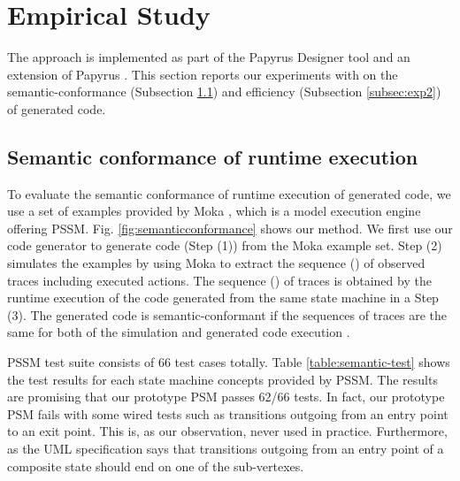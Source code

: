 \section{Empirical Study}
\label{sec:exp}
The approach is implemented as part of the Papyrus Designer tool \cite{qompass} and an extension  of Papyrus \cite{cea-list_papyrus_????}. This section reports our experiments with  on the semantic-conformance (Subsection \ref{subsec:exp1}) and efficiency (Subsection \ref{subsec:exp2}) of generated code.

\subsection{Semantic conformance of runtime execution}
\label{subsec:exp1}
\noindent
{} 

To evaluate the semantic conformance of runtime execution of generated code, we use a set of examples provided by Moka \cite{moka}, which is a model execution engine offering PSSM. Fig. \ref{fig:semanticconformance} shows our method. We first use our code generator to generate code (Step (1)) from the Moka example set. Step (2) simulates the examples by using Moka to extract the sequence () of observed traces including executed actions. The sequence () of traces is obtained by the runtime execution of the code generated from the same state machine in a Step (3). The generated code is semantic-conformant if the sequences of traces are the same for both of the simulation and generated code execution \cite{Blech2005}. %



PSSM test suite consists of 66 test cases totally.
Table \ref{table:semantic-test} shows the test results for each state machine concepts provided by PSSM. 
The results are promising that our prototype PSM passes 62/66 tests. 
In fact, our prototype PSM fails with some wired tests such as transitions outgoing from an entry point to an exit point. 
This is, as our observation, never used in practice. 
Furthermore, as the UML specification says that transitions outgoing from an entry point of a composite state should end on one of the sub-vertexes.

